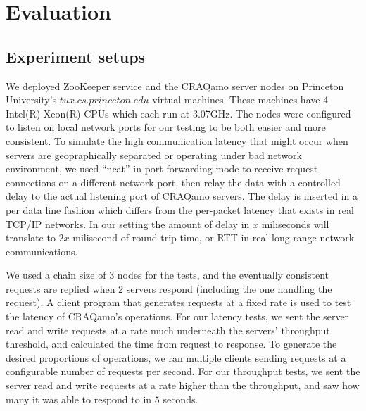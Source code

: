 \section{Evaluation}
\label{sec:eval}

\subsection{Experiment setups}
We deployed ZooKeeper service and the CRAQamo server nodes on Princeton University's $tux.cs.princeton.edu$ virtual machines.
These machines have 4 Intel(R) Xeon(R) CPUs which each run at 3.07GHz. The nodes were configured to listen on local network ports for our testing to be both easier and more consistent. To simulate the high communication latency that might occur when servers are geopraphically separated or operating under bad network environment, we used ``ncat'' in port forwarding mode to receive request connections on a different network port, then relay the data with a controlled delay to the actual listening port of CRAQamo servers. The delay is inserted in a per data line fashion which differs from the per-packet latency that exists in real TCP/IP networks. In our setting the amount of delay in $x$ miliseconds will
translate to $2x$ milisecond of round trip time, or RTT in real long range network communications. 

We used a chain size of 3 nodes for the tests, and the eventually consistent requests are replied when 2 servers respond (including the one handling the request). A client program that generates requests at a fixed rate is used to test the latency of CRAQamo's operations. For our latency tests, we sent the server read and write requests at a rate much underneath the servers' throughput threshold, and calculated the time from request to response.  To generate the desired proportions of operations, we ran multiple clients sending requests at a configurable number of requests per second.  For our throughput tests, we sent the server read and write requests at a rate higher than the throughput, and saw how many it was able to respond to in $5$ seconds.

